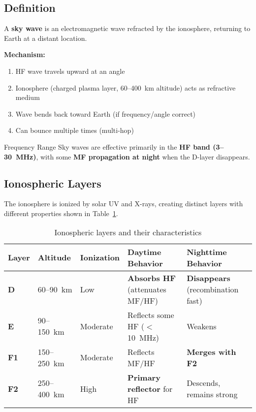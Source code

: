 \subsection{Definition}

A \textbf{sky wave} is an electromagnetic wave refracted by the ionosphere, returning to Earth at a distant location.

\textbf{Mechanism:}
\begin{enumerate}
\item HF wave travels upward at an angle
\item Ionosphere (charged plasma layer, 60--400~km altitude) acts as refractive medium
\item Wave bends back toward Earth (if frequency/angle correct)
\item Can bounce multiple times (multi-hop)
\end{enumerate}

\begin{calloutbox}{Frequency Range}
Sky waves are effective primarily in the \textbf{HF band (3--30~MHz)}, with some \textbf{MF propagation at night} when the D-layer disappears.
\end{calloutbox}

\subsection{Ionospheric Layers}

The ionosphere is ionized by solar UV and X-rays, creating distinct layers with different properties shown in Table~\ref{tab:ionospheric-layers}.

\begin{table}[htbp]
\centering
\caption{Ionospheric layers and their characteristics}
\label{tab:ionospheric-layers}
\small
\begin{tabular}{@{}lllll@{}}
\toprule
\textbf{Layer} & \textbf{Altitude} & \textbf{Ionization} & \textbf{Daytime Behavior} & \textbf{Nighttime Behavior} \\
\midrule
\textbf{D} & 60--90~km & Low & \textbf{Absorbs HF} (attenuates MF/HF) & \textbf{Disappears} (recombination fast) \\
\textbf{E} & 90--150~km & Moderate & Reflects some HF ($<$10~MHz) & Weakens \\
\textbf{F1} & 150--250~km & Moderate & Reflects MF/HF & \textbf{Merges with F2} \\
\textbf{F2} & 250--400~km & High & \textbf{Primary reflector} for HF & Descends, remains strong \\
\bottomrule
\end{tabular}
\end{table}

